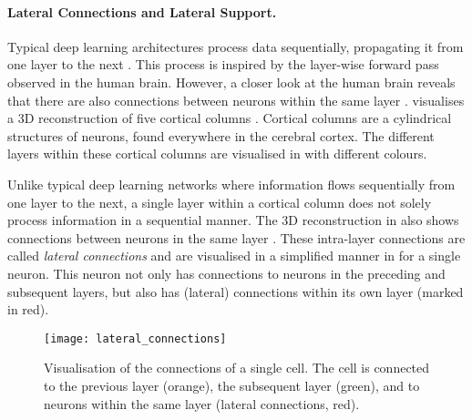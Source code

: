 \paragraph{Lateral Connections and Lateral Support.} Typical deep learning architectures process data sequentially, propagating it from one layer to the next . 
This process is inspired  by the layer-wise forward pass observed in the human brain.
However, a closer look at the human brain reveals that there are also connections between neurons within the same layer .
 visualises a 3D reconstruction of five cortical columns . Cortical columns are a cylindrical structures of neurons, found everywhere in the cerebral cortex. 
The different layers within these cortical columns are visualised in  with different colours.

Unlike typical deep learning networks where information flows sequentially from one layer to the next, a single layer within a cortical column does not solely process information in a sequential manner. The 3D reconstruction in  also shows connections between neurons in the same layer .
These intra-layer connections are called \emph{lateral connections} and are visualised in a simplified manner in  for a single neuron.
This neuron not only has connections to neurons in the preceding and subsequent layers, but also has (lateral) connections within its own layer (marked in red).

\begin{figure}[h]
    \centering
    \texttt{[image: lateral\_connections]}
    \caption[Lateral connections of a cell]{Visualisation of the connections of a single cell. The cell is connected to the previous layer (orange), the subsequent layer (green), and to neurons within the same layer (lateral connections, red).}
\end{figure}

